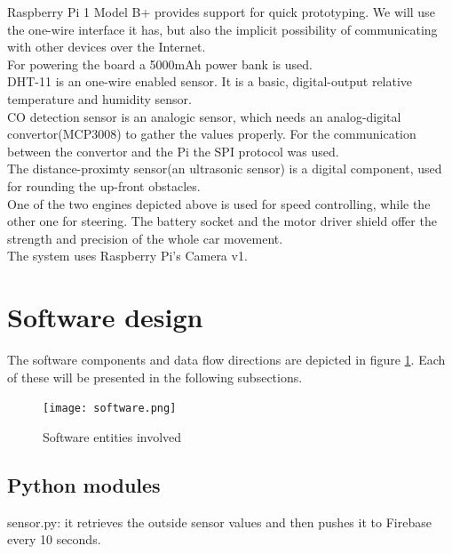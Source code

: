 \documentclass[a4paper,11pt]{article}
\begin{document}
Raspberry Pi 1 Model B+ provides support for quick prototyping. We will use the one-wire interface it has, but also the implicit possibility of communicating with other devices over the Internet. \\

For powering the board a 5000mAh power bank is used.\\

DHT-11 is an one-wire enabled sensor. It is a basic, digital-output relative temperature and humidity sensor.\\

CO detection sensor is an analogic sensor, which needs an analog-digital convertor(MCP3008) to gather the values properly. For the communication between the convertor and the Pi the SPI protocol was used.\\

The distance-proximty sensor(an ultrasonic sensor) is a digital component, used for rounding the up-front obstacles.\\

One of the two engines depicted above is used for speed controlling, while the other one for steering. The battery socket and the motor driver shield offer the strength and precision of the whole car movement.\\

The system uses Raspberry Pi's Camera v1.\\


\section{Software design}

The software components and data flow directions are depicted in figure \ref{fig:soft-design}. Each of these will be presented in the following subsections.\\

\begin{figure}[h]
\centering
\texttt{[image: software.png]}
\caption{Software entities involved}
\label{fig:soft-design}
\end{figure}
 
\subsection{Python modules}

sensor.py: it retrieves the outside sensor values and then pushes it to Firebase every 10 seconds.\\
\end{document}
